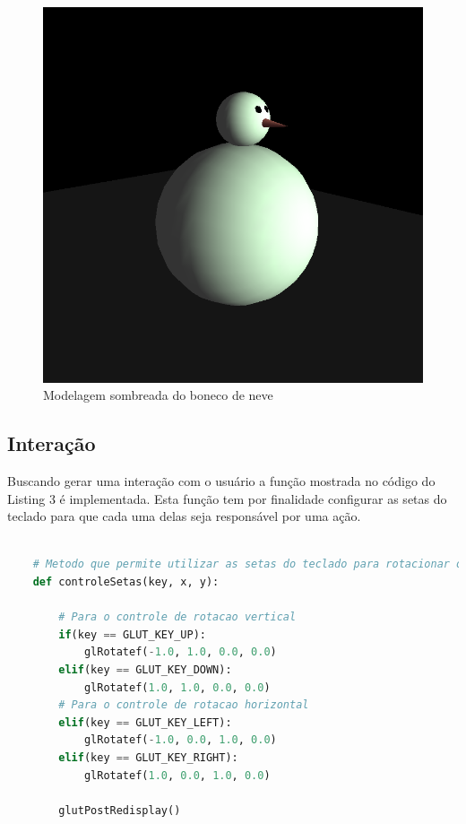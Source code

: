 \documentclass[
	article,			%
	11pt,				%
	oneside,			%
	a4paper,			%
	english,			%
	brazil,				%
	sumario=tradicional
	]{abntex2}
\begin{document}
\begin{figure}[h]
	\centering\includegraphics[width=0.9\linewidth]{bonecos.png}
	\caption{Modelagem sombreada do boneco de neve}
\end{figure}

\subsection{Interação}

Buscando gerar uma interação com o usuário a função mostrada no código do Listing 3
é implementada. Esta função tem por finalidade configurar as setas do teclado para que cada uma
delas seja responsável por uma ação.

\begin{lstlisting}[language=Python, caption=Interação com o usuário]
   
	# Metodo que permite utilizar as setas do teclado para rotacionar o boneco
	def controleSetas(key, x, y):
	
		# Para o controle de rotacao vertical
		if(key == GLUT_KEY_UP):
			glRotatef(-1.0, 1.0, 0.0, 0.0)
		elif(key == GLUT_KEY_DOWN):
			glRotatef(1.0, 1.0, 0.0, 0.0)
		# Para o controle de rotacao horizontal
		elif(key == GLUT_KEY_LEFT):
			glRotatef(-1.0, 0.0, 1.0, 0.0)
		elif(key == GLUT_KEY_RIGHT):
			glRotatef(1.0, 0.0, 1.0, 0.0)
	
		glutPostRedisplay()
	
\end{lstlisting}
\end{document}

